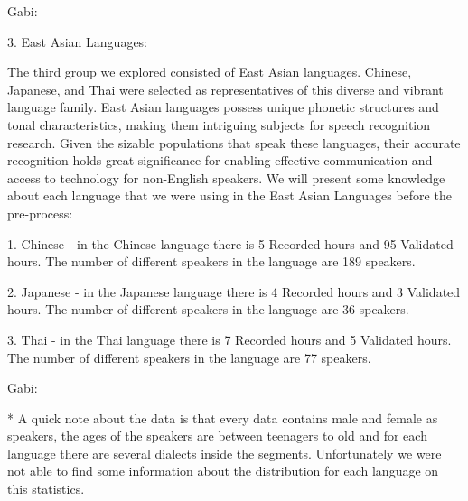 \documentclass[a4paper]{article}
\begin{document}
Gabi:

3. East Asian Languages:

The third group we explored consisted of East Asian languages. Chinese, Japanese, and Thai were selected as representatives of this diverse and vibrant language family. East Asian languages possess unique phonetic structures and tonal characteristics, making them intriguing subjects for speech recognition research. Given the sizable populations that speak these languages, their accurate recognition holds great significance for enabling effective communication and access to technology for non-English speakers. We will present some knowledge about each language that we were using in the East Asian Languages before the pre-process:

1. Chinese - in the Chinese language there is 5 Recorded hours and 95 Validated hours. The number of different speakers in the language are 189 speakers.

2. Japanese - in the Japanese language there is 4 Recorded hours and 3 Validated hours. The number of different speakers in the language are 36 speakers.

3. Thai - in the Thai language there is 7 Recorded hours and 5 Validated hours. The number of different speakers in the language are 77 speakers.\newline

Gabi:

\begin{table}[ht]
\centering
\caption{Languages and sub-languages}
\label{tab:Languages}
\end{table}

* A quick note about the data is that every data contains male and female as speakers, the ages of the speakers are between teenagers to old and for each language there are several dialects inside the segments. Unfortunately we were not able to find some information about the distribution for each language on this statistics.\newline
\end{document}

